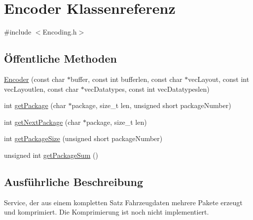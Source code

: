 \hypertarget{classEncoder}{\section{Encoder Klassenreferenz}
\label{classEncoder}
}


{\ttfamily \#include $<$Encoding.\-h$>$}

\subsection*{Öffentliche Methoden}
\begin{DoxyCompactItemize}
\item 
\hyperlink{classEncoder_ac957151409a5f04f3d3065d730decbed}{Encoder} (const char $\ast$buffer, const int bufferlen, const char $\ast$vec\-Layout, const int vec\-Layoutlen, const char $\ast$vec\-Datatypes, const int vec\-Datatypeslen)
\item 
int \hyperlink{classEncoder_a311f7e2d81ee27cf1c73c62bad1c046b}{get\-Package} (char $\ast$package, size\-\_\-t len, unsigned short package\-Number)
\item 
int \hyperlink{classEncoder_aebc183e41020b51fbbd054ecc448e83b}{get\-Next\-Package} (char $\ast$package, size\-\_\-t len)
\item 
int \hyperlink{classEncoder_ac2567f8f3c63f486f82758b4da51b660}{get\-Package\-Size} (unsigned short package\-Number)
\item 
unsigned int \hyperlink{classEncoder_a32406ccfc04e12f876f07be50c5b2c6b}{get\-Package\-Sum} ()
\end{DoxyCompactItemize}


\subsection{Ausführliche Beschreibung}
Service, der aus einem kompletten Satz Fahrzeugdaten mehrere Pakete erzeugt und komprimiert. Die Komprimierung ist noch nicht implementiert. 

